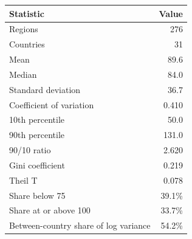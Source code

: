 \begin{tabular}{lr}
\toprule
Statistic & Value \\
\midrule
Regions & 276 \\
Countries & 31 \\
Mean & 89.6 \\
Median & 84.0 \\
Standard deviation & 36.7 \\
Coefficient of variation & 0.410 \\
10th percentile & 50.0 \\
90th percentile & 131.0 \\
90/10 ratio & 2.620 \\
Gini coefficient & 0.219 \\
Theil T & 0.078 \\
Share below 75 & 39.1\% \\
Share at or above 100 & 33.7\% \\
Between-country share of log variance & 54.2\% \\
\bottomrule
\end{tabular}
